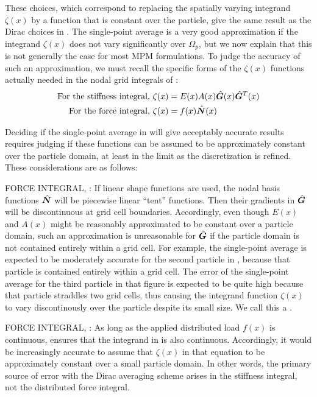 These choices, which correspond to replacing the spatially varying integrand $\zeta(x)$ by a function that is constant over the particle, give the same result as the Dirac choices in .  The single-point average is a very good approximation if the integrand $\zeta(x)$ does not vary significantly over $\Omega_p$, but we now explain that this is not generally the case for most MPM formulations.  To judge the accuracy of such an approximation, we must recall the specific forms of the $\zeta(x)$ functions actually needed in the nodal grid integrals of
:
\begin{subequations}
\begin{align}
 \text{For the stiffness integral, } & \zeta(x)=E(x)A(x)\hat{\bm{G}}(x)\hat{\bm{G}}^T(x)
\label{eq:kintegrand}
\\
 \text{For the force integral, } & \zeta(x)=f(x)\hat{\bm{N}}(x)
\label{eq:fintegrand}
\end{align}
\label{none}
\end{subequations}

Deciding if the single-point average in  will give acceptably accurate results requires judging if these functions can be assumed to be approximately constant over the particle domain, at least in the limit as the discretization is refined. These considerations are as follows:
\begin{list}{}{}
\item FORCE INTEGRAL, :  If linear shape functions are used, the nodal basis functions $\hat{\bm{N}}$ will be piecewise linear ``tent'' functions. Then their gradients in $\hat{\bm{G}}$ will be discontinuous at grid cell boundaries.  Accordingly, even though $E(x)$ and $A(x)$ might be reasonably approximated to be constant over a particle domain, such an approximation is unreasonable for $\hat{\bm{G}}$ if the particle domain is not contained entirely within a grid cell. For example, the single-point average is expected to be moderately accurate for the second particle in , because that particle is contained entirely within a grid cell. The error of the single-point average for the third particle in that figure is expected to be quite high because that particle straddles two grid cells, thus causing the integrand function $\zeta(x)$ to vary discontinously over the particle despite its small size. We call this a .
\item FORCE INTEGRAL,  : As long as the applied distributed load $f(x)$ is continuous,  ensures that the integrand in  is also continuous. Accordingly, it would be increasingly accurate to assume that $\zeta(x)$ in that equation to be approximately constant over a small particle domain. In other words, the primary source of error with the Dirac averaging scheme arises in the stiffness integral, not the distributed force integral.
\end{list}


